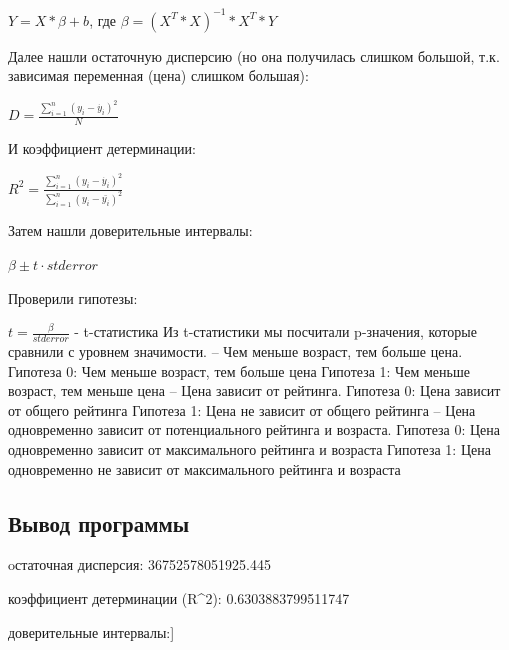 \documentclass{article}
\begin{document}
$Y = X * \beta + b$, где $\beta = (X^T * X)^{-1} * X^T * Y$

Далее нашли остаточную дисперсию (но она получилась слишком большой, т.к. зависимая переменная (цена) слишком большая):

$D = \frac{\sum^n_{i=1}(y_i - \dot{y_i} )^2}{N}$

И коэффициент детерминации:

$R^2 = \frac{\sum^n_{i=1}(y_i - \dot{y_i} )^2}{\sum^n_{i=1}(y_i - \bar{y_i} )^2}$

Затем нашли доверительные интервалы:

$\beta \pm t \cdot {std error}$

Проверили гипотезы:

$t = \frac{\beta}{std error}$ - t-статистика\newline
\newline
Из t-статистики мы посчитали p-значения, которые сравнили с уровнем значимости.
\newline\newline
– Чем меньше возраст, тем больше цена.\newline
Гипотеза 0: Чем меньше возраст, тем больше цена\newline
Гипотеза 1: Чем меньше возраст, тем меньше цена\newline
\newline
– Цена зависит от рейтинга.\newline
Гипотеза 0: Цена зависит от общего рейтинга\newline
Гипотеза 1: Цена не зависит от общего рейтинга\newline
\newline
– Цена одновременно зависит от потенциального рейтинга и возраста.\newline
Гипотеза 0: Цена одновременно зависит от максимального рейтинга и возраста\newline
Гипотеза 1: Цена одновременно не зависит от максимального рейтинга и возраста\newline


\subsection{Вывод программы}\label{subsec:-}

oстаточная дисперсия: 36752578051925.445

коэффициент детерминации (R^2): 0.6303883799511747\newline

доверительные интервалы:\newline
 [[-9.81950579e+02  7.94591426e+01]\newline
 [ 7.44766964e+05  7.78262804e+05]\newline
 [-3.50468306e+05 -3.10758256e+05]\newline
 [-4.02023606e+07 -3.83877071e+07]]\newline
\end{document}
